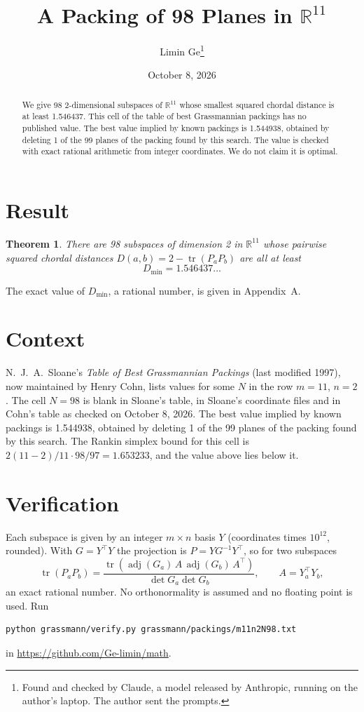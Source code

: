 \documentclass[11pt,a4paper]{article}
\title{A Packing of 98 Planes in $\mathbb{R}^{11}$}
\author{Limin Ge\thanks{Found and checked by Claude, a model released by Anthropic, running on the author's laptop. The author sent the prompts.}}
\date{October 8, 2026}
\newtheorem*{theorem}{Theorem}
\begin{document}
\maketitle
\begin{abstract}
We give 98 2-dimensional subspaces of $\mathbb{R}^{11}$ whose smallest squared chordal distance is at least 1.546437. This cell of the table of best Grassmannian packings has no published value. The best value implied by known packings is 1.544938, obtained by deleting 1 of the 99 planes of the packing found by this search. The value is checked with exact rational arithmetic from integer coordinates. We do not claim it is optimal.
\end{abstract}

\section{Result}
\begin{theorem}
There are 98 subspaces of dimension 2 in $\mathbb{R}^{11}$ whose pairwise squared chordal distances $D(a,b) = 2 - \operatorname{tr}(P_aP_b)$ are all at least
\[ D_{\min} = 1.546437\ldots \]
\end{theorem}
The exact value of $D_{\min}$, a rational number, is given in Appendix~A.


\section{Context}
N.~J.~A.~Sloane's \emph{Table of Best Grassmannian Packings} (last modified 1997), now maintained by Henry Cohn, lists values for some $N$ in the row $m=11$, $n=2$. The cell $N=98$ is blank in Sloane's table, in Sloane's coordinate files and in Cohn's table as checked on October 8, 2026. The best value implied by known packings is 1.544938, obtained by deleting 1 of the 99 planes of the packing found by this search. The Rankin simplex bound for this cell is $2(11-2)/11\cdot 98/97 = 1.653233$, and the value above lies below it.


\section{Verification}
Each subspace is given by an integer $m\times n$ basis $Y$ (coordinates times $10^{12}$, rounded). With $G=Y^\top Y$ the projection is $P=YG^{-1}Y^\top$, so for two subspaces
\[ \operatorname{tr}(P_aP_b)=\frac{\operatorname{tr}(\operatorname{adj}(G_a)\,A\,\operatorname{adj}(G_b)\,A^\top)}{\det G_a\det G_b},\qquad A=Y_a^\top Y_b, \]
an exact rational number. No orthonormality is assumed and no floating point is used. Run
\begin{verbatim}
python grassmann/verify.py grassmann/packings/m11n2N98.txt
\end{verbatim}
in \url{https://github.com/Ge-limin/math}.
\end{document}
